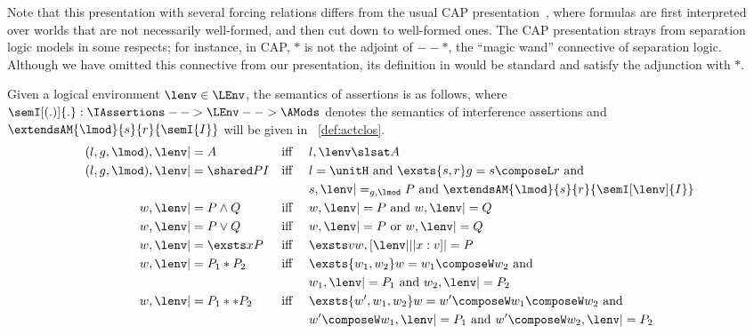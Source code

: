 Note that this presentation with several forcing relations differs from the usual CAP presentation~\cite{cap-ecoop10}, where formulas are first interpreted over worlds that are not necessarily well-formed, and then cut down to well-formed ones. The CAP presentation strays from separation logic models in some respects; for instance, in CAP, $*$ is not the adjoint of $--*$, the ``magic wand'' connective of separation logic. Although we have omitted this connective from our presentation, its definition in \colosl would be standard and satisfy the adjunction with $*$.
%
%
\begin{definition}\label{def:assertion-semantics}
Given a logical environment $\lenv \in \LEnv$, the semantics of \colosl assertions is as follows, where $\semI[(.)]{.}: \IAssertions --> \LEnv --> \AMods$ denotes the semantics of interference assertions and $\extendsAM{\lmod}{s}{r}{\semI{I}}$ will be given in ~\ref{def:actclos}.
%
\begin{align*}
  (l,g,\lmod), \lenv &|= A &&\text{iff  }&& l,\lenv \slsat A\\
%  
  (l,g,\lmod), \lenv &|= \shared P I &&\text{iff}&&
  l = \unitH\text{ and }
  \exsts{s,r}
  g = s\composeL r
  \text{ and}\\
  &&&&&s, \lenv |=_{g,\lmod} P\text{ and }
  \extendsAM{\lmod}{s}{r}{\semI[\lenv]{I}}\\
%  
%
	w, \lenv &|= P \land Q
  &&\text{iff}&& w,\lenv |= P \text{ and } w,\lenv |= Q\\
%  
  w, \lenv &|= P \lor Q
  &&\text{iff}&& w,\lenv |= P \text{ or } w,\lenv |= Q\\
%  
  w, \lenv &|= \exsts x P
  &&\text{iff}&& \exsts v w, [\lenv|||x:v] |= P\\
%  
  w, \lenv &|= P_1 * P_2 &&\text{iff}&&
  \exsts{w_1, w_2} w = w_1 \composeW w_2\text{ and}\\
  &&&&& w_1, \lenv |= P_1 \text{ and } w_2, \lenv |= P_2\\
%  
%  
  w, \lenv &|= P_1 ** P_2 &&\text{iff}&&
  \exsts{w',w_1, w_2} w = w' \composeW w_1 \composeW w_2\text{ and}\\
  &&&&&
  w' \composeW w_1, \lenv |= P_1 \text{ and }
  w' \composeW w_2, \lenv |= P_2\\
%  

\end{align*}
\end{definition}
